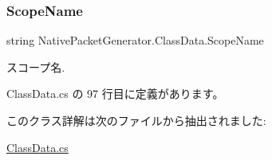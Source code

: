 \subsubsection{\texorpdfstring{Scope\+Name}{ScopeName}}
{\footnotesize\ttfamily string Native\+Packet\+Generator.\+Class\+Data.\+Scope\+Name\hspace{0.3cm}{\ttfamily [get]}}



スコープ名. 



 Class\+Data.\+cs の 97 行目に定義があります。



このクラス詳解は次のファイルから抽出されました\+:\begin{DoxyCompactItemize}
\item 
\mbox{\hyperlink{ClassData_8cs}{Class\+Data.\+cs}}\end{DoxyCompactItemize}
